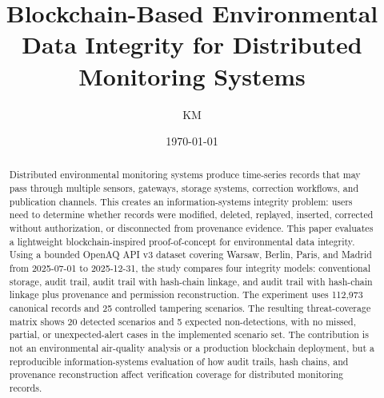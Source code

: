 \documentclass[11pt]{article}
\title{Blockchain-Based Environmental Data Integrity for Distributed Monitoring Systems}
\author{KM}
\date{\today}
\begin{document}
\maketitle

\begin{abstract}
Distributed environmental monitoring systems produce time-series records that may pass through multiple sensors, gateways, storage systems, correction workflows, and publication channels. This creates an information-systems integrity problem: users need to determine whether records were modified, deleted, replayed, inserted, corrected without authorization, or disconnected from provenance evidence. This paper evaluates a lightweight blockchain-inspired proof-of-concept for environmental data integrity. Using a bounded OpenAQ API v3 dataset covering Warsaw, Berlin, Paris, and Madrid from 2025-07-01 to 2025-12-31, the study compares four integrity models: conventional storage, audit trail, audit trail with hash-chain linkage, and audit trail with hash-chain linkage plus provenance and permission reconstruction. The experiment uses 112,973 canonical records and 25 controlled tampering scenarios. The resulting threat-coverage matrix shows 20 detected scenarios and 5 expected non-detections, with no missed, partial, or unexpected-alert cases in the implemented scenario set. The contribution is not an environmental air-quality analysis or a production blockchain deployment, but a reproducible information-systems evaluation of how audit trails, hash chains, and provenance reconstruction affect verification coverage for distributed monitoring records.
\end{abstract}











\end{document}
